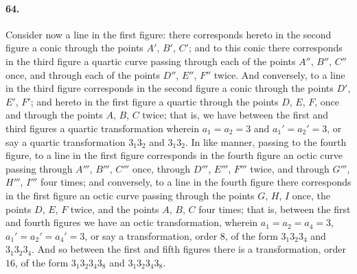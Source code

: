 \documentclass[11pt]{article}
\begin{document}
\paragraph{64.}
Consider now a line in the first figure: there corresponds hereto in the
second figure a conic through the points $A'$, $B'$, $C'$; and to this
conic there corresponds in the third figure a quartic curve passing
through each of the points $A''$, $B''$, $C''$ once, and through each of
the points $D''$, $E''$, $F''$ twice. And conversely, to a line in the
third figure corresponds in the second figure a conic through the points
$D'$, $E'$, $F'$; and hereto in the first figure a quartic through the
points $D$, $E$, $F$, once and through the points $A$, $B$, $C$ twice;
that is, we have between the first and third figures a quartic
transformation wherein $a_{1}=a_{2}=3$ and $a_{1}'=a_{2}'=3$, or say a
quartic transformation $3_{1}3_{2}$ and $3_{1}3_{2}$. In like manner,
passing to the fourth figure, to a line in the first figure corresponds
in the fourth figure an octic curve passing through $A'''$, $B'''$,
$C'''$ once, through $D'''$, $E'''$, $F'''$ twice, and through $G'''$,
$H'''$, $I'''$ four times; and conversely, to a line in the fourth figure
there corresponds in the first figure an octic curve passing through the
points $G$, $H$, $I$ once, the points $D$, $E$, $F$ twice, and the points
$A$, $B$, $C$ four times; that is, between the first and fourth figures
we have an octic transformation, wherein
$a_{1}=a_{2}=a_{4}=3$, $a_{1}'=a_{2}'=a_{4}'=3$, or say a transformation,
order $8$, of the form $3_{1}3_{2}3_{4}$ and $3_{1}3_{2}3_{4}$. And so
between the first and fifth figures there is a transformation, order
$16$, of the form $3_{1}3_{2}3_{4}3_{8}$ and $3_{1}3_{2}3_{4}3_{8}$.

\medskip
\end{document}

